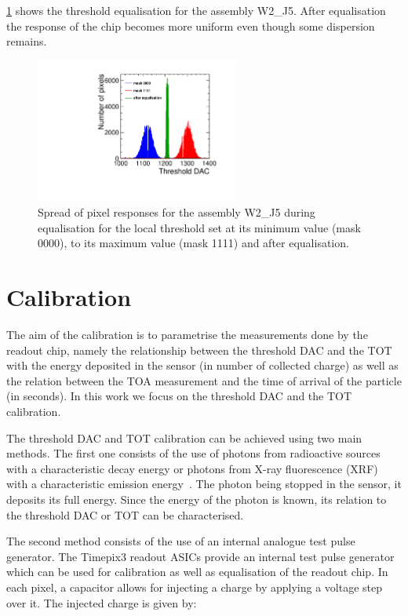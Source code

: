 \cref{fig:THLequalisation} shows the threshold equalisation for the
assembly W2\_J5. After equalisation the response of the chip becomes
more uniform even though some dispersion remains.

\begin{figure}[htbp] 
  \centering
  \includegraphics[width=0.6\textwidth]{./figures/Calibration/THLequalisation_W2_J5.pdf}
  \caption{Spread of pixel responses for the assembly W2\_J5 during
    equalisation for the local threshold set at its minimum value
    (mask 0000), to its maximum value (mask 1111) and after
    equalisation.}
  \label{fig:THLequalisation}
\end{figure}

\section{Calibration} \label{sec:calibration} 

The aim of the calibration is to parametrise the measurements done by
the readout chip, namely the relationship between the threshold DAC
and the TOT with the energy deposited in the sensor (in number of
collected charge) as well as the relation between the TOA measurement
and the time of arrival of the particle (in seconds). In this work we
focus on the threshold DAC and the TOT calibration.

The threshold DAC and TOT calibration can be achieved using two main
methods. The first one consists of the use of photons from radioactive
sources with a characteristic decay energy or photons from X-ray
fluorescence (XRF) with a characteristic emission
energy~\cite{AlipourTehrani:2054922}. The photon being stopped in the
sensor, it deposits its full energy. Since the energy of the photon is
known, its relation to the threshold DAC or TOT can be characterised. 

The second method consists of the use of an internal analogue test
pulse generator. The Timepix3 readout ASICs provide an internal test
pulse generator which can be used for calibration as well as
equalisation of the readout chip. In each pixel, a capacitor allows
for injecting a charge by applying a voltage step over it. The
injected charge is given by:

